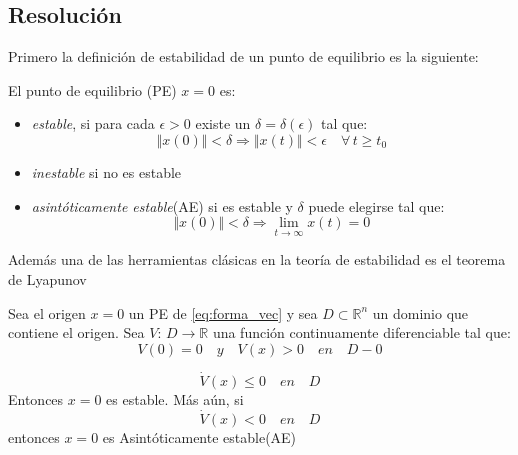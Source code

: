 \documentclass[10pt]{article}
\begin{document}
\subsection{Resolución}

Primero la definición de estabilidad de un punto de equilibrio es la siguiente:


\begin{defi}[Estabilidad PE] 
    El punto de equilibrio (PE) $x=0$ es:
  \begin{itemize}
    \item \textit{estable}, si para cada $\epsilon > 0$ existe un $\delta = \delta(\epsilon)$ tal que:
        \begin{equation}
            \Vert x(0) \Vert < \delta \Longrightarrow \Vert x(t) \Vert < \epsilon \quad  \forall \, t \geq t_0 \label{eq:est_uni}
        \end{equation}

    \item \textit{inestable} si no es estable 
     
    \item \textit{asintóticamente estable}(AE) si es estable y $\delta$ puede elegirse tal que:
        \begin{equation}
            \Vert x(0) \Vert < \delta \Longrightarrow \lim \limits_{t \rightarrow \infty}x(t)=0
        \end{equation}
    \end{itemize}
\end{defi}

Además una de las herramientas clásicas en la teoría de estabilidad es el teorema de Lyapunov
\begin{teo}[Lyapunov]
    Sea el origen $x=0$ un PE de \eqref{eq:forma_vec} y sea $D \subset \mathbb{R}^{n}$ un dominio
    que contiene el origen. Sea $V$: $D \rightarrow \mathbb{R}$ una función continuamente diferenciable tal que:
    \begin{equation}
        V(0)=0 \quad y \quad V(x) > 0 \quad en \quad D-{0} \label{eq:def_pos}
    \end{equation}
    
    \begin{equation}
        \dot{V}(x) \leq 0 \quad en \quad D
    \end{equation}
    Entonces $x=0$ es estable. Más aún, si 
    \begin{equation}
        \dot{V}(x) < 0 \quad en \quad D
    \end{equation}
    entonces $x=0$ es Asintóticamente estable(AE)
\end{teo}
\end{document}
